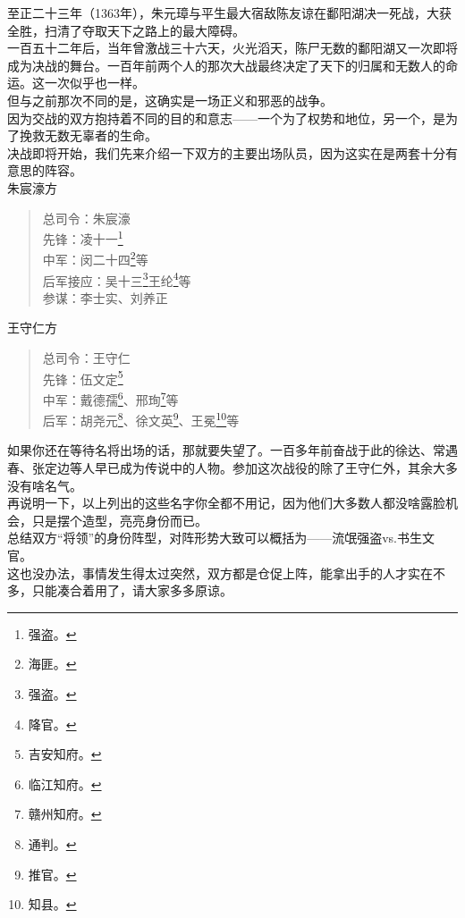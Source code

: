 \begin{multicols}{\theparacolNo}
至正二十三年（1363年），朱元璋与平生最大宿敌陈友谅在鄱阳湖决一死战，大获全胜，扫清了夺取天下之路上的最大障碍。\\

一百五十二年后，当年曾激战三十六天，火光滔天，陈尸无数的鄱阳湖又一次即将成为决战的舞台。一百年前两个人的那次大战最终决定了天下的归属和无数人的命运。这一次似乎也一样。\\

但与之前那次不同的是，这确实是一场正义和邪恶的战争。\\

因为交战的双方抱持着不同的目的和意志——一个为了权势和地位，另一个，是为了挽救无数无辜者的生命。\\

决战即将开始，我们先来介绍一下双方的主要出场队员，因为这实在是两套十分有意思的阵容。\\

朱宸濠方
{\footnotesize \begin{quote}
	总司令：朱宸濠\\
	先锋：凌十一\footnote{强盗。}\\
	中军：闵二十四\footnote{海匪。}等\\
	后军接应：吴十三\footnote{强盗。}王纶\footnote{降官。}等\\
	参谋：李士实、刘养正\\
\end{quote}}

王守仁方
{\footnotesize \begin{quote}
	总司令：王守仁\\
	先锋：伍文定\footnote{吉安知府。}\\
	中军：戴德孺\footnote{临江知府。}、邢珣\footnote{赣州知府。}等\\
	后军：胡尧元\footnote{通判。}、徐文英\footnote{推官。}、王冕\footnote{知县。}等\\
\end{quote}}

如果你还在等待名将出场的话，那就要失望了。一百多年前奋战于此的徐达、常遇春、张定边等人早已成为传说中的人物。参加这次战役的除了王守仁外，其余大多没有啥名气。\\

再说明一下，以上列出的这些名字你全都不用记，因为他们大多数人都没啥露脸机会，只是摆个造型，亮亮身份而已。\\

总结双方“将领”的身份阵型，对阵形势大致可以概括为——流氓强盗vs.书生文官。\\

这也没办法，事情发生得太过突然，双方都是仓促上阵，能拿出手的人才实在不多，只能凑合着用了，请大家多多原谅。\\


\end{multicols}
